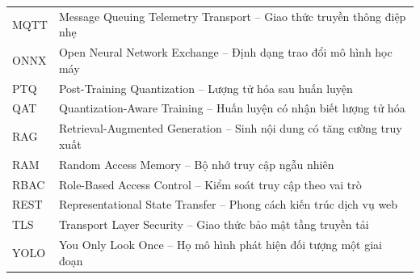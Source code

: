 \begin{longtable}{L{2.6cm}L{11.5cm}}
MQTT    & Message Queuing Telemetry Transport -- Giao thức truyền thông điệp nhẹ\\
ONNX    & Open Neural Network Exchange -- Định dạng trao đổi mô hình học máy\\
PTQ     & Post-Training Quantization -- Lượng tử hóa sau huấn luyện\\
QAT     & Quantization-Aware Training -- Huấn luyện có nhận biết lượng tử hóa\\
RAG     & Retrieval-Augmented Generation -- Sinh nội dung có tăng cường truy xuất\\
RAM     & Random Access Memory -- Bộ nhớ truy cập ngẫu nhiên\\
RBAC    & Role-Based Access Control -- Kiểm soát truy cập theo vai trò\\
REST    & Representational State Transfer -- Phong cách kiến trúc dịch vụ web\\
TLS     & Transport Layer Security -- Giao thức bảo mật tầng truyền tải\\
YOLO    & You Only Look Once -- Họ mô hình phát hiện đối tượng một giai đoạn\\
\bottomrule
\end{longtable}
